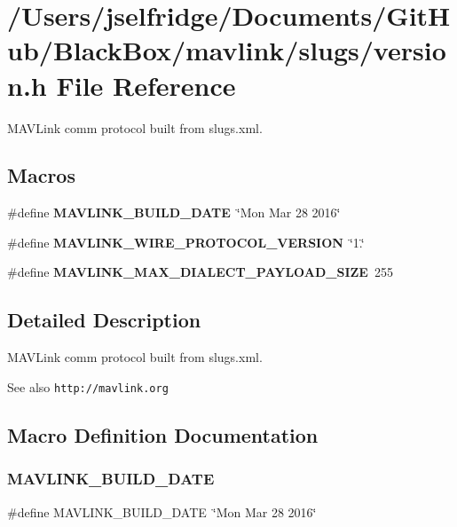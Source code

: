 \section{/\+Users/jselfridge/\+Documents/\+Git\+Hub/\+Black\+Box/mavlink/slugs/version.h File Reference}
\label{slugs_2version_8h}


M\+A\+V\+Link comm protocol built from slugs.\+xml.  


\subsection*{Macros}
\begin{DoxyCompactItemize}
\item 
\#define \textbf{ M\+A\+V\+L\+I\+N\+K\+\_\+\+B\+U\+I\+L\+D\+\_\+\+D\+A\+TE}~\char`\"{}Mon Mar 28 2016\char`\"{}
\item 
\#define \textbf{ M\+A\+V\+L\+I\+N\+K\+\_\+\+W\+I\+R\+E\+\_\+\+P\+R\+O\+T\+O\+C\+O\+L\+\_\+\+V\+E\+R\+S\+I\+ON}~\char`\"{}1.\char`\"{}
\item 
\#define \textbf{ M\+A\+V\+L\+I\+N\+K\+\_\+\+M\+A\+X\+\_\+\+D\+I\+A\+L\+E\+C\+T\+\_\+\+P\+A\+Y\+L\+O\+A\+D\+\_\+\+S\+I\+ZE}~255
\end{DoxyCompactItemize}


\subsection{Detailed Description}
M\+A\+V\+Link comm protocol built from slugs.\+xml. 

\begin{DoxySeeAlso}{See also}
{\tt http\+://mavlink.\+org} 
\end{DoxySeeAlso}


\subsection{Macro Definition Documentation}
\mbox{\label{slugs_2version_8h_ab31250f0c93f71e42393b68a7cfe7585}} 
\subsubsection{M\+A\+V\+L\+I\+N\+K\+\_\+\+B\+U\+I\+L\+D\+\_\+\+D\+A\+TE}
{\footnotesize\ttfamily \#define M\+A\+V\+L\+I\+N\+K\+\_\+\+B\+U\+I\+L\+D\+\_\+\+D\+A\+TE~\char`\"{}Mon Mar 28 2016\char`\"{}}


